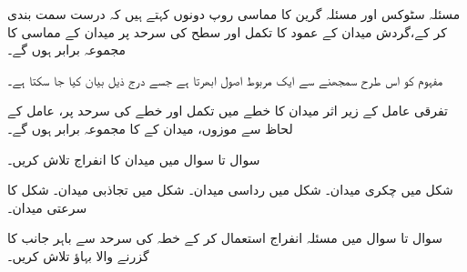 مسئلہ سٹوکس اور مسئلہ گرین کا مماسی روپ دونوں  کہتے ہیں  کہ  درست سمت بندی کر کے،گردش   میدان  کے عمود      کا تکمل اور  سطح کی سرحد پر میدان کے  مماسی    کا مجموعہ برابر ہوں گے۔

مفہوم کو اس طرح  سمجھنے  سے  ایک  مربوط اصول   ابھرتا ہے جسے درج ذیل بیان کیا جا سکتا ہے۔

  تفرقی عامل کے زیر اثر  میدان  کا  خطے میں تکمل اور خطے کی سرحد پر، عامل کے لحاظ سے موزوں،    میدان کے    کا مجموعہ برابر ہوں گے۔


سوال   تا سوال   میں میدان کا انفراج تلاش کریں۔

شکل   میں  چکری میدان۔
شکل     میں رداسی میدان۔
شکل    میں تجاذبی میدان۔ 
شکل  کا سرعتی میدان۔

سوال  تا سوال   میں مسئلہ انفراج استعمال کر کے خطہ  کی سرحد سے باہر جانب   کا گزرنے والا بہاؤ تلاش کریں۔

